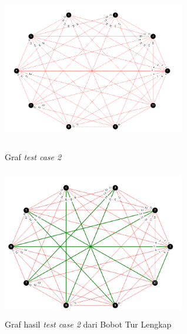 \documentclass{article}
\begin{document}
	\begin{figure}[htbp]
	\centering
	\includegraphics[width=8cm, height=6.5cm]{tc4_i.png}
	\caption{Graf \textit{test case 2}}
	\includegraphics[width=8cm, height=6.5cm]{tc4.png}
	\caption{Graf hasil \textit{test case 2} dari Bobot Tur Lengkap}
	\end{figure}
	
\end{document}
